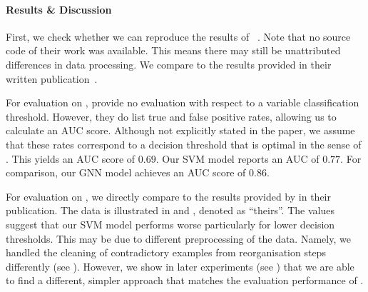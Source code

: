 \documentclass[
	fontsize=10pt, %
	twoside=true, %
	secnumdepth=1, %
  toc=indentunnumbered %
]{kaobook}
\begin{document}
\paragraph{Results \& Discussion}

First, we check whether we can reproduce the results of \nielsen{}~\cite{nielsen_MachineLearningSupport_2019}. Note that no
source code of their work was available. This means there may still be
unattributed differences in data processing. We compare to the results
provided in their written
publication~\cite{nielsen_MachineLearningSupport_2019}.

For evaluation on \PDMap{}, \nielsen{} provide no evaluation with respect to a
variable classification threshold. However, they do list true and false positive
rates, allowing us to calculate an AUC score. Although not explicitly stated in
the paper, we assume that these rates correspond to a decision threshold  
 that is optimal in the sense of . This yields an
 AUC score of $0.69$. Our SVM model reports an AUC of $0.77$. For comparison,
 our GNN model achieves an AUC score of $0.86$.

 For evaluation on \ReconMap{}, we directly compare to the results provided by
 \nielsen{} in their publication. The data is illustrated in
  and ,
 denoted as ``theirs''.
 The values suggest that our SVM model performs worse particularly for lower
 decision thresholds. This may be due to different preprocessing of the data.
 Namely, we handled the cleaning of contradictory examples from reorganisation
 steps differently (see ). However, we show in later
 experiments (see ) that we are able to
 find a different, simpler approach that matches the evaluation performance of
 \nielsen{}.
 
\end{document}
